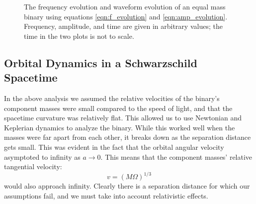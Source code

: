 \begin{figure}[htbp]
\center
{}
\caption{The frequency evolution and waveform evolution of an equal mass binary using equations \ref{eqn:f_evolution} and \ref{eqn:amp_evolution}. Frequency, amplitude, and time are given in arbitrary values; the time in the two plots is not to scale.}
\label{fig:GW_evolution}
\end{figure}


\subsection{Orbital Dynamics in a Schwarzschild Spacetime}
\label{sec:schwarzchild_dynamics}

In the above analysis we assumed the relative velocities of the binary's component masses were small compared to the speed of light, and that the spacetime curvature was relatively flat. This allowed us to use Newtonian and Keplerian dynamics to analyze the binary. While this worked well when the masses were far apart from each other, it breaks down as the separation distance gets small. This was evident in the fact that the orbital angular velocity asymptoted to infinity as $a \rightarrow 0$. This means that the component masses' relative tangential velocity:
\begin{equation}
v = (M\Omega)^{1/3}
\end{equation}
would also approach infinity. Clearly there is a separation distance for which our assumptions fail, and we must take into account relativistic effects.


